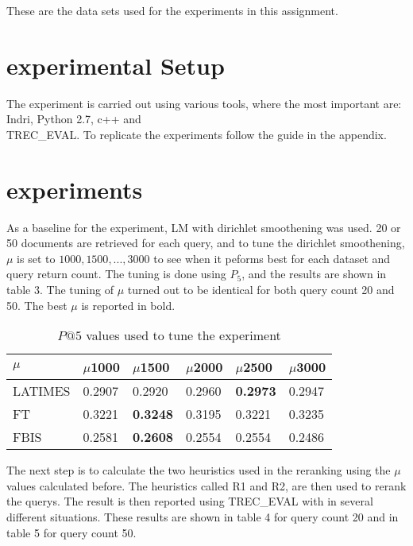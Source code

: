\documentclass{sig-alternate}
\begin{document}
These are the data sets used for the experiments in this assignment.

\section{experimental Setup}
The experiment is carried out using various tools, where the most important are: Indri, Python 2.7, c++ and \\TREC\_EVAL. To replicate the experiments follow the guide in the appendix.

\section{experiments}
As a baseline for the experiment, LM with dirichlet smoothening was used. 20 or 50 documents are retrieved for each query, and to tune the dirichlet smoothening, $\mu$ is set to ${1000,1500,...,3000}$ to see when it peforms best for each dataset and query return count. The tuning is done using $P_5$, and the results are shown in table 3. The tuning of $\mu$ turned out to be identical for both query count 20 and 50. The best $\mu$ is reported in bold.

\begin{table}[h!]
\centering
\begin{tabular}{|l|l|l|l|l|l|}
\hline
 $\mu$ & $\mu$1000 & $\mu$1500 & $\mu$2000 & $\mu$2500 & $\mu$3000  \\ \hline
LATIMES & 0.2907 & 0.2920 & 0.2960 & \textbf{0.2973} & 0.2947 \\ \hline
FT & 0.3221 & \textbf{0.3248} & 0.3195 & 0.3221 & 0.3235  \\ \hline
FBIS & 0.2581 & \textbf{0.2608} & 0.2554 & 0.2554 & 0.2486 \\  \hline
\end{tabular}
\caption{$P@5$ values used to tune the experiment}
\end{table}

The next step is to calculate the two heuristics used in the reranking using the $\mu$ values calculated before. The heuristics called R1 and R2, are then used to rerank the querys. The result is then reported using TREC\_EVAL with in several different situations. These results are shown in table 4 for query count 20 and in table 5 for query count 50.
\end{document}
